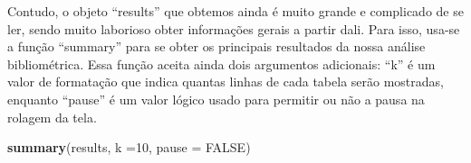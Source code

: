 \documentclass[]{article}
\newenvironment{Shaded}{\begin{snugshade}}{\end{snugshade}}
\newcommand{\DataTypeTok}[1]{\textcolor[rgb]{0.13,0.29,0.53}{#1}}
\newcommand{\DecValTok}[1]{\textcolor[rgb]{0.00,0.00,0.81}{#1}}
\newcommand{\KeywordTok}[1]{\textcolor[rgb]{0.13,0.29,0.53}{\textbf{#1}}}
\newcommand{\NormalTok}[1]{#1}
\newcommand{\OtherTok}[1]{\textcolor[rgb]{0.56,0.35,0.01}{#1}}
\begin{document}
Contudo, o objeto ``results'' que obtemos ainda é muito grande e
complicado de se ler, sendo muito laborioso obter informações gerais a
partir dali. Para isso, usa-se a função ``summary'' para se obter os
principais resultados da nossa análise bibliométrica. Essa função aceita
ainda dois argumentos adicionais: ``k'' é um valor de formatação que
indica quantas linhas de cada tabela serão mostradas, enquanto ``pause''
é um valor lógico usado para permitir ou não a pausa na rolagem da tela.

\begin{Shaded}
\begin{Highlighting}[]
\KeywordTok{summary}\NormalTok{(results, }\DataTypeTok{k =}\DecValTok{10}\NormalTok{, }\DataTypeTok{pause =} \OtherTok{FALSE}\NormalTok{)}
\end{Highlighting}
\end{Shaded}
\end{document}
